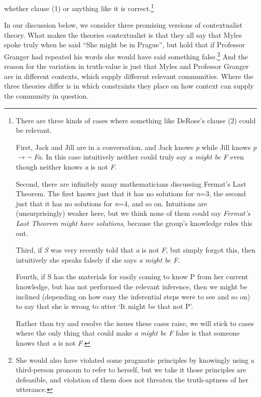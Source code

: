 \documentclass[
  11pt,
  letterpaper,
  DIV=11,
  numbers=noendperiod,
  twoside]{scrartcl}
\begin{document}
whether clause (1) or anything like it is correct.\footnote{There are
  three kinds of cases where something like DeRose's clause (2) could be
  relevant.

  First, Jack and Jill are in a conversation, and Jack knows \emph{p}
  while Jill knows \emph{p} \({\rightarrow \neg}\) \emph{Fa}. In this
  case intuitively neither could truly say \emph{a might be F} even
  though neither knows \emph{a} is not \emph{F}.

  Second, there are infinitely many mathematicians discussing Fermat's
  Last Theorem. The first knows just that it has no solutions for
  \emph{n}=3, the second just that it has no solutions for \emph{n}=4,
  and so on. Intuitions are (unsurprisingly) weaker here, but we think
  none of them could say \emph{Fermat's Last Theorem} \emph{might have
  solutions}, because the group's knowledge rules this out.

  Third, if \emph{S} was very recently told that \emph{a} is not
  \emph{F}, but simply forgot this, then intuitively she speaks falsely
  if she says \emph{a might be F}.

  Fourth, if S has the materials for easily coming to know P from her
  current knowledge, but has not performed the relevant inference, then
  we might be inclined (depending on how easy the inferential steps were
  to see and so on) to say that she is wrong to utter `It might be that
  not P'.

  Rather than try and resolve the issues these cases raise, we will
  stick to cases where the only thing that could make \emph{a might be
  F} false is that someone knows that \emph{a} is not \emph{F}.}

In our discussion below, we consider three promising versions of
contextualist theory. What makes the theories contextualist is that they
all say that Myles spoke truly when he said ``She might be in Prague'',
but hold that if Professor Granger had repeated his words she would have
said something false.\footnote{She would also have violated some
  pragmatic principles by knowingly using a third-person pronoun to
  refer to herself, but we take it those principles are defeasible, and
  violation of them does not threaten the truth-aptness of her
  utterance.} And the reason for the variation in truth-value is just
that Myles and Professor Granger are in different contexts, which supply
different relevant communities. Where the three theories differ is in
which constraints they place on how context can supply the community in
question.
\end{document}
